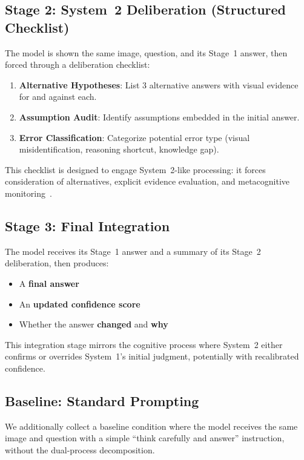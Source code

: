 \documentclass{cvpr}
\begin{document}
\subsection{Stage 2: System~2 Deliberation (Structured Checklist)}
The model is shown the same image, question, and its Stage~1 answer, then forced through a deliberation checklist:
\begin{enumerate}
    \item \textbf{Alternative Hypotheses}: List 3 alternative answers with visual evidence for and against each.
    \item \textbf{Assumption Audit}: Identify assumptions embedded in the initial answer.
    \item \textbf{Error Classification}: Categorize potential error type (visual misidentification, reasoning shortcut, knowledge gap).
\end{enumerate}
This checklist is designed to engage System~2-like processing: it forces consideration of alternatives, explicit evidence evaluation, and metacognitive monitoring~\cite{wang2024metacognitive}.

\subsection{Stage 3: Final Integration}
The model receives its Stage~1 answer and a summary of its Stage~2 deliberation, then produces:
\begin{itemize}
    \item A \textbf{final answer}
    \item An \textbf{updated confidence score}
    \item Whether the answer \textbf{changed} and \textbf{why}
\end{itemize}
This integration stage mirrors the cognitive process where System~2 either confirms or overrides System~1's initial judgment, potentially with recalibrated confidence.

\subsection{Baseline: Standard Prompting}
We additionally collect a baseline condition where the model receives the same image and question with a simple ``think carefully and answer'' instruction, without the dual-process decomposition.
\end{document}
